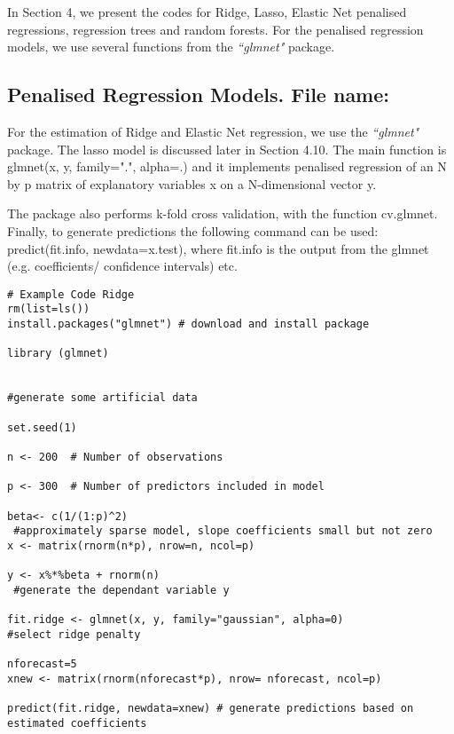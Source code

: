 \documentclass[12pt]{article}
\begin{document}
In Section 4, we present the codes for Ridge, Lasso, Elastic Net penalised regressions, regression trees and random forests. For the penalised regression models, we use several functions from the \emph{``glmnet"} package.
\subsection{Penalised Regression Models. File name: \color{blue}{Ridge.R, ElasticNet.R}}

For the estimation of Ridge and Elastic Net regression, we use the \emph{``glmnet"} package. The lasso model is discussed later in Section 4.10. The main function is glmnet(x, y, family=".", alpha=.) and it implements penalised regression of an N by p matrix of explanatory variables x on a N-dimensional vector y.

The package also performs k-fold cross validation, with the function cv.glmnet. Finally, to generate predictions the following command can be used: predict(fit.info, newdata=x.test), where fit.info is the output from the glmnet (e.g. coefficients/ confidence intervals) etc.


\begin{lstlisting}[title=\textbf{Ridge Penalised Regression.}]
# Example Code Ridge
rm(list=ls())
install.packages("glmnet") # download and install package

library (glmnet)


#generate some artificial data

set.seed(1)

n <- 200  # Number of observations

p <- 300  # Number of predictors included in model

beta<- c(1/(1:p)^2)
 #approximately sparse model, slope coefficients small but not zero
x <- matrix(rnorm(n*p), nrow=n, ncol=p)

y <- x%*%beta + rnorm(n)
 #generate the dependant variable y

fit.ridge <- glmnet(x, y, family="gaussian", alpha=0)
#select ridge penalty

nforecast=5
xnew <- matrix(rnorm(nforecast*p), nrow= nforecast, ncol=p)

predict(fit.ridge, newdata=xnew) # generate predictions based on estimated coefficients

\end{lstlisting}
\end{document}
